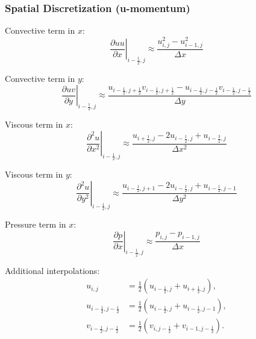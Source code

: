 \subsubsection*{Spatial Discretization (u-momentum)}

Convective term in $x$:
\begin{equation}
  \left.\frac{\partial uu}{\partial x}\right|_{i-\frac{1}{2},j} \approx \frac{u_{i,j}^2 - u_{i-1,j}^2}{\Delta x} \label{eq:conv_x}
\end{equation}

Convective term in $y$:
\begin{equation}
  \left.\frac{\partial uv}{\partial y}\right|_{i-\frac{1}{2},j} \approx \frac{u_{i-\frac{1}{2},j+\frac{1}{2}} v_{i-\frac{1}{2},j+\frac{1}{2}} - u_{i-\frac{1}{2},j-\frac{1}{2}} v_{i-\frac{1}{2},j-\frac{1}{2}}}{\Delta y} \label{eq:conv_y}
\end{equation}

Viscous term in $x$:
\begin{equation}
  \left.\frac{\partial^2 u}{\partial x^2}\right|_{i-\frac{1}{2},j} \approx \frac{u_{i+\frac{1}{2},j} - 2u_{i-\frac{1}{2},j} + u_{i-\frac{3}{2},j}}{\Delta x^2} \label{eq:visc_x}
\end{equation}

Viscous term in $y$:
\begin{equation}
  \left.\frac{\partial^2 u}{\partial y^2}\right|_{i-\frac{1}{2},j} \approx \frac{u_{i-\frac{1}{2},j+1} - 2u_{i-\frac{1}{2},j} + u_{i-\frac{1}{2},j-1}}{\Delta y^2} \label{eq:visc_y}
\end{equation}

Pressure term in $x$:
\begin{equation}
  \left.\frac{\partial p}{\partial x}\right|_{i-\frac{1}{2},j} \approx \frac{p_{i,j} - p_{i-1,j}}{\Delta x} \label{eq:pres_x}
\end{equation}

Additional interpolations:
\begin{align}
  u_{i,j} &= \frac{1}{2}\left(u_{i-\frac{1}{2},j} + u_{i+\frac{1}{2},j}\right), \label{eq:u_interp} \\
  u_{i-\frac{1}{2},j-\frac{1}{2}} &= \frac{1}{2}\left(u_{i-\frac{1}{2},j} + u_{i-\frac{1}{2},j-1}\right), \label{eq:u_half_interp} \\
  v_{i-\frac{1}{2},j-\frac{1}{2}} &= \frac{1}{2}\left(v_{i,j-\frac{1}{2}} + v_{i-1,j-\frac{1}{2}}\right). \label{eq:v_half_interp}
\end{align}

